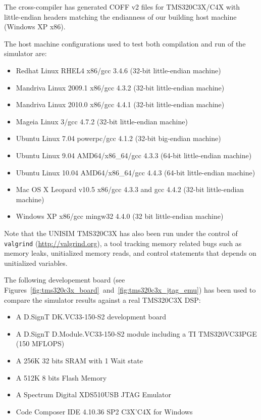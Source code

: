 The cross-compiler has generated COFF v2 files for TMS320C3X/C4X with little-endian headers matching the endianness of our building host machine (Windows XP x86).

\noindent The host machine configurations used to test both compilation and run of the simulator are:
\begin{itemize}
\item Redhat Linux RHEL4 x86/gcc 3.4.6 (32-bit little-endian machine)
\item Mandriva Linux 2009.1 x86/gcc 4.3.2 (32-bit little-endian machine)
\item Mandriva Linux 2010.0 x86/gcc 4.4.1 (32-bit little-endian machine)
\item Mageia Linux 3/gcc 4.7.2 (32-bit little-endian machine)
\item Ubuntu Linux 7.04 powerpc/gcc 4.1.2 (32-bit big-endian machine)
\item Ubuntu Linux 9.04 AMD64/x86\_64/gcc 4.3.3 (64-bit little-endian machine)
\item Ubuntu Linux 10.04 AMD64/x86\_64/gcc 4.4.3 (64-bit little-endian machine)
\item Mac OS X Leopard v10.5 x86/gcc 4.3.3 and gcc 4.4.2 (32-bit little-endian machine)
\item Windows XP x86/gcc mingw32 4.4.0 (32 bit little-endian machine)
\end{itemize}

Note that the UNISIM TMS320C3X has also been run under the control of \texttt{valgrind} (\url{http://valgrind.org}), a tool tracking memory related bugs such as memory leaks, unitialized memory reads, and control statements that depends on unitialized variables.

The following developement board (see Figures~\ref{fig:tms320c3x_board}~and~\ref{fig:tms320c3x_jtag_emu}) has been used to compare the simulator results against a real TMS320C3X DSP:
\begin{itemize}
\item A D.SignT DK.VC33-150-S2 development board
\item A D.SignT D.Module.VC33-150-S2 module including a TI TMS320VC33PGE (150 MFLOPS)
\item A 256K 32 bits SRAM with 1 Wait state
\item A 512K 8 bits Flash Memory
\item A Spectrum Digital XDS510USB JTAG Emulator
\item Code Composer IDE 4.10.36 SP2 C3X'C4X for Windows
\end{itemize}

